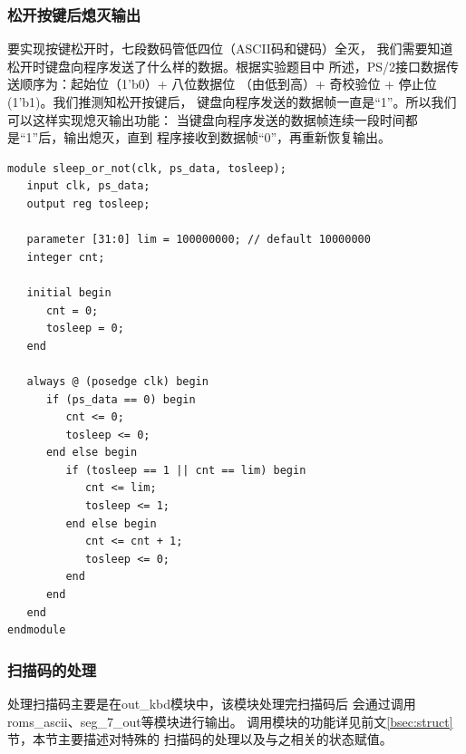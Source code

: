 \documentclass[12pt,a4paper,UTF8]{article}
\begin{document}
\subsubsection{松开按键后熄灭输出}
要实现按键松开时，七段数码管低四位（ASCII码和键码）全灭，
我们需要知道松开时键盘向程序发送了什么样的数据。根据实验题目中
所述，PS/2接口数据传送顺序为：起始位（1'b0）+ 八位数据位
（由低到高）+ 奇校验位 + 停止位(1'b1)。我们推测知松开按键后，
键盘向程序发送的数据帧一直是``1''。所以我们可以这样实现熄灭输出功能：
当键盘向程序发送的数据帧连续一段时间都是``1''后，输出熄灭，直到
程序接收到数据帧``0''，再重新恢复输出。
\begin{lstlisting}[style=verilog-style]
module sleep_or_not(clk, ps_data, tosleep);
   input clk, ps_data;
   output reg tosleep;
   
   parameter [31:0] lim = 100000000; // default 10000000
   integer cnt;

   initial begin
      cnt = 0;
      tosleep = 0;
   end
   
   always @ (posedge clk) begin
      if (ps_data == 0) begin
         cnt <= 0;
         tosleep <= 0;
      end else begin
         if (tosleep == 1 || cnt == lim) begin
            cnt <= lim;
            tosleep <= 1;
         end else begin
            cnt <= cnt + 1;
            tosleep <= 0;
         end
      end
   end 
endmodule 
\end{lstlisting}

\subsubsection{扫描码的处理}
处理扫描码主要是在\mbox{out\_kbd}模块中，该模块处理完扫描码后
会通过调用\mbox{roms\_ascii}、\mbox{seg\_7\_out}等模块进行输出。
调用模块的功能详见前文\ref*{bsec:struct}节，本节主要描述对特殊的
扫描码的处理以及与之相关的状态赋值。
\end{document}
